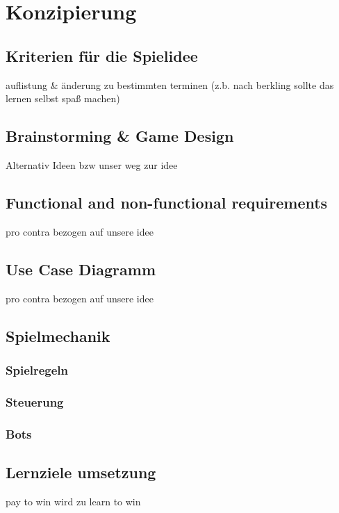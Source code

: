 \section{Konzipierung}
\subsection{Kriterien für die Spielidee}\label{ssec:kriterien}
	auflistung \& änderung zu bestimmten terminen (z.b. nach berkling sollte das lernen selbst spaß machen)
\subsection{Brainstorming \& Game Design}\label{ssec:idee}
	Alternativ Ideen bzw unser weg zur idee
\subsection{Functional and non-functional requirements}
	pro contra bezogen auf unsere idee
\subsection{Use Case Diagramm}
	pro contra bezogen auf unsere idee
\subsection{Spielmechanik}
	\subsubsection{Spielregeln}
	\subsubsection{Steuerung}
	\subsubsection{Bots}
\subsection{Lernziele umsetzung}
	pay to win  wird zu  learn to win
